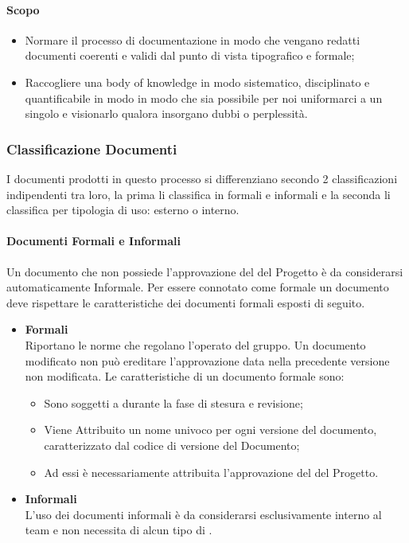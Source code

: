             \paragraph{Scopo}
                \begin{itemize}
                    \item Normare il processo di documentazione in modo che vengano redatti documenti coerenti e validi dal punto di vista tipografico e formale;
                    \item Raccogliere una body of knowledge in modo sistematico, disciplinato e quantificabile in modo in modo che sia possibile per noi uniformarci a un singolo  e visionarlo qualora insorgano dubbi o perplessità.
                \end{itemize}
        \subsubsection{Classificazione Documenti}
            I documenti prodotti in questo processo si differenziano secondo 2 classificazioni indipendenti tra loro, la prima li classifica in formali e informali e la seconda li classifica per tipologia di uso: esterno o interno.
            \paragraph{Documenti Formali e Informali}
                Un documento che non possiede l’approvazione del  del Progetto è da considerarsi automaticamente Informale. Per essere connotato come formale un documento deve rispettare le caratteristiche dei documenti formali esposti di seguito.
                \begin{itemize}
                    \item\textbf{Formali}\\
                        Riportano le norme che regolano l’operato del gruppo. Un documento modificato non può ereditare l’approvazione data nella precedente versione non modificata.
                        Le caratteristiche di un documento formale sono:
                        \begin{itemize}
                            \item  Sono soggetti a  durante la fase di stesura e revisione;
                            \item Viene Attribuito un nome univoco per ogni versione del documento, caratterizzato dal codice di versione del Documento;
                            \item  Ad essi è necessariamente attribuita l’approvazione del  del Progetto.
                        \end{itemize}

                    \item\textbf{Informali}\\
                        L’uso dei documenti informali è da considerarsi esclusivamente interno al team e non necessita di alcun tipo di .
                \end{itemize}
